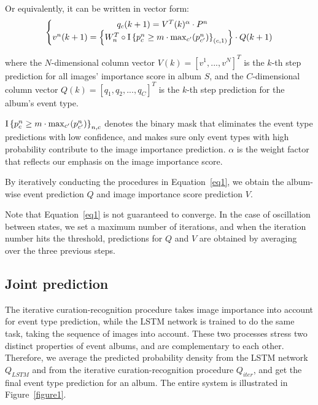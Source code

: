 \documentclass[runningheads]{llncs}
\begin{document}
Or equivalently, it can be written in vector form:
\begin{equation}
\left\{\begin{matrix}
q_{c}(k+1) = V^{T}(k)^{\alpha }\cdot  P^{n}\\ 
v^{n}(k+1) = \left \{W_{n}^{T} \circ \textup{I}\left \{ p^{n}_{c}\geq m\cdot \max_{c'}(p^{n}_{c'}) \right \}_{(c,1)}\right \} \cdot  Q(k+1)
\end{matrix}\right.
\end{equation}

where the $N$-dimensional column vector $V(k) = [v^{1}, ..., v^{N}]^{T}$ is the $k$-th step prediction for all images' importance score in album $S$, and the $C$-dimensional column vector $Q(k) = [q_{1}, q_{2},..., q_{C}]^{T}$ is the $k$-th step prediction for the album's event type.

$\textup{I}\left \{ p^{n}_{c}\geq m\cdot \max_{c'}(p^{n}_{c'}) \right \}_{n,c}$ denotes the binary mask that eliminates the event type predictions with low confidence, and makes sure only event types with high probability contribute to the image importance prediction. 
$\alpha$ is the weight factor that reflects our emphasis on the image importance score.

By iteratively conducting the procedures in Equation~\ref{eq1}, we obtain the album-wise event prediction $Q$ and image importance score prediction $V$. 

Note that Equation~\ref{eq1} is not guaranteed to converge. In the case of oscillation between states, we set a maximum number of iterations, and when the iteration number hits the threshold,  predictions for $Q$ and $V$ are obtained by averaging over the three previous steps.
\subsection{Joint prediction}
The iterative curation-recognition procedure takes image importance into account for event type prediction, while the LSTM network is trained to do the same task, taking the sequence of images into account. These two processes stress two distinct properties of  event albums, and are complementary to each other. Therefore, we average the predicted probability density from the LSTM network $Q_{LSTM}$ and from the iterative curation-recognition procedure $Q_{iter}$, and get the final event type prediction for an album. The entire system is illustrated in Figure~\ref{figure1}.
\end{document}
